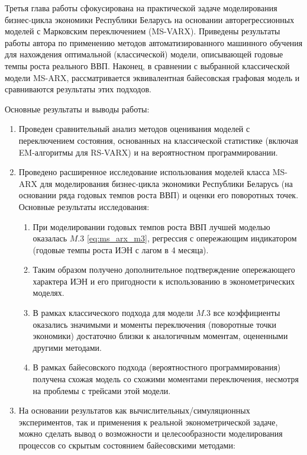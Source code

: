 \documentclass[a4paper,14pt]{extreport}
\begin{document}
Третья глава работы сфокусирована на практической задаче моделирования бизнес-цикла экономики Республики Беларусь на основании авторегрессионных моделей с Марковским переключением (MS-VARX). Приведены результаты работы автора по применению методов автоматизированного машинного обучения для нахождения оптимальной (классической) модели, описывающей годовые темпы роста реального ВВП. Наконец, в сравнении с выбранной классической модели MS-ARX, рассматривается эквивалентная байесовская графовая модель и сравниваются результаты этих подходов.

\clearpage

Основные результаты и выводы работы:

\begin{enumerate}
	\item Проведен сравнительный анализ методов оценивания моделей с переключением состояния, основанных на классической статистике (включая EM-алгоритмы для RS-VARX) и на вероятностном программировании.
	\item Проведено расширенное исследование использования моделей класса MS-ARX для моделирования бизнес-цикла экономики Республики Беларусь (на основании ряда годовых темпов роста ВВП) и оценки его поворотных точек. Основные результаты исследования:
	      \begin{enumerate}
		      \item При моделировании годовых темпов роста ВВП лучшей моделью оказалась $M.3$ \eqref{eq:ms_arx_m3}, регрессия с опережающим индикатором (годовые темпы роста ИЭН с лагом в 4 месяца).
		      \item Таким образом получено дополнительное подтверждение опережающего характера ИЭН и его пригодности к использованию в эконометрических моделях.
		      \item В рамках классического подхода для модели $M.3$ все коэффициенты оказались значимыми и моменты переключения (поворотные точки экономики) достаточно близки к аналогичным моментам, оцененными другими методами.
		      \item В рамках байесовского подхода (вероятностного программирования) получена схожая модель со схожими моментами переключения, несмотря на проблемы с трейсами этой модели.
	      \end{enumerate}
	\item На основании результатов как вычислительных/симуляционных экспериментов, так и применения к реальной эконометрической задаче, можно сделать вывод о возможности и целесообразности моделирования процессов со скрытым состоянием байесовскими методами:

\end{enumerate}
\end{document}
